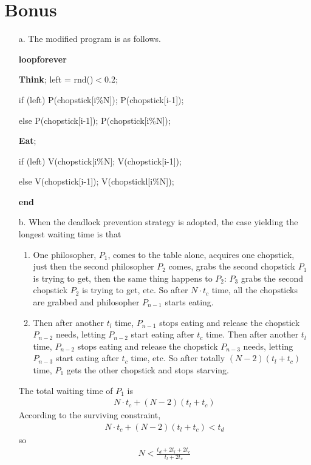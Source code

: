 \documentclass[12pt,letterpaper]{article}
\begin{document}
\section*{Bonus}
\begin{itemize}
\item[a.] The modified program is as follows.

\textbf{loopforever}

\hspace{3em}\textbf{Think}; left = rnd()$<$0.2;

\hspace{3em}if (left) P(chopstick[i\%N]); P(chopstick[i-1]);

\hspace{3em}else P(chopstick[i-1]); P(chopstick[i\%N]);

\hspace{3em}\textbf{Eat};

\hspace{3em}if (left) V(chopstick[i\%N]; V(chopstick[i-1]);

\hspace{3em}else V(chopstick[i-1]); V(chopstickl[i\%N]);

\textbf{end}

\item[b.] When the deadlock prevention strategy is adopted, the case yielding the longest waiting time is that
\begin{enumerate}
\item One philosopher, $P_1$, comes to the table alone, acquires one chopstick, just then the second philosopher $P_2$ comes, grabs the second chopstick $P_1$ is trying to get, then the same thing happens to $P_2$: $P_3$ grabs the second chopstick $P_2$ is trying to get, etc. So after $N\cdot t_c$ time, all the chopsticks are grabbed and philosopher $P_{n-1}$ starts eating. 
\item Then after another $t_l$ time, $P_{n-1}$ stops eating and release the chopstick $P_{n-2}$ needs, letting $P_{n-2}$ start eating after $t_c$ time. Then after another $t_l$ time, $P_{n-2}$ stops eating and release the chopstick $P_{n-3}$ needs, letting $P_{n-3}$ start eating after $t_c$ time, etc. So after totally $(N-2)(t_l+t_c)$ time, $P_1$ gets the other chopstick and stops starving.
\end{enumerate}
The total waiting time of $P_1$ is
\begin{align}
N\cdot t_c+(N-2)(t_l+t_c)
\end{align}
According to the surviving constraint,
\begin{align}
N\cdot t_c+(N-2)(t_l+t_c)<t_d
\end{align}
so 
\begin{align}
N < \frac{t_d+2t_l+2t_c}{t_l+2t_c}
\end{align}
\end{itemize}
\end{document}
